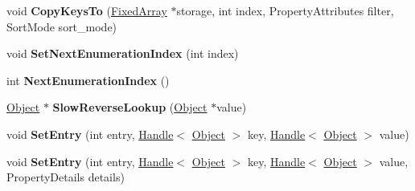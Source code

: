 \begin{DoxyCompactItemize}
\item 
\hypertarget{classv8_1_1internal_1_1_dictionary_a0ecb5aac775a8723cd88bb5cbca04d72}{}void {\bfseries Copy\+Keys\+To} (\hyperlink{classv8_1_1internal_1_1_fixed_array}{Fixed\+Array} $\ast$storage, int index, Property\+Attributes filter, Sort\+Mode sort\+\_\+mode)\label{classv8_1_1internal_1_1_dictionary_a0ecb5aac775a8723cd88bb5cbca04d72}

\item 
\hypertarget{classv8_1_1internal_1_1_dictionary_a77837a47ebe1937fd3b0cccc2b2fbd4b}{}void {\bfseries Set\+Next\+Enumeration\+Index} (int index)\label{classv8_1_1internal_1_1_dictionary_a77837a47ebe1937fd3b0cccc2b2fbd4b}

\item 
\hypertarget{classv8_1_1internal_1_1_dictionary_af1df140b75b3e96cb9211faca31c7f8f}{}int {\bfseries Next\+Enumeration\+Index} ()\label{classv8_1_1internal_1_1_dictionary_af1df140b75b3e96cb9211faca31c7f8f}

\item 
\hypertarget{classv8_1_1internal_1_1_dictionary_ac4e09479a5db5eeb3fc72b24c5af1325}{}\hyperlink{classv8_1_1internal_1_1_object}{Object} $\ast$ {\bfseries Slow\+Reverse\+Lookup} (\hyperlink{classv8_1_1internal_1_1_object}{Object} $\ast$value)\label{classv8_1_1internal_1_1_dictionary_ac4e09479a5db5eeb3fc72b24c5af1325}

\item 
\hypertarget{classv8_1_1internal_1_1_dictionary_a7c06c3dbd747928f8f7f93ffbebc331a}{}void {\bfseries Set\+Entry} (int entry, \hyperlink{classv8_1_1internal_1_1_handle}{Handle}$<$ \hyperlink{classv8_1_1internal_1_1_object}{Object} $>$ key, \hyperlink{classv8_1_1internal_1_1_handle}{Handle}$<$ \hyperlink{classv8_1_1internal_1_1_object}{Object} $>$ value)\label{classv8_1_1internal_1_1_dictionary_a7c06c3dbd747928f8f7f93ffbebc331a}

\item 
\hypertarget{classv8_1_1internal_1_1_dictionary_a5ffecfeed3054083564312029b8b0dd0}{}void {\bfseries Set\+Entry} (int entry, \hyperlink{classv8_1_1internal_1_1_handle}{Handle}$<$ \hyperlink{classv8_1_1internal_1_1_object}{Object} $>$ key, \hyperlink{classv8_1_1internal_1_1_handle}{Handle}$<$ \hyperlink{classv8_1_1internal_1_1_object}{Object} $>$ value, Property\+Details details)\label{classv8_1_1internal_1_1_dictionary_a5ffecfeed3054083564312029b8b0dd0}

\end{DoxyCompactItemize}
